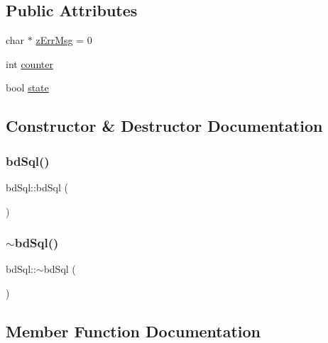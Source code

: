 \subsection*{Public Attributes}
\begin{DoxyCompactItemize}
\item 
char $\ast$ \mbox{\hyperlink{classbd_sql_abaf69eb30f16320aa8d2f91d6aa43b7d}{z\+Err\+Msg}} = 0
\item 
int \mbox{\hyperlink{classbd_sql_a1c7d57e529b44058fda8f4bd2ad47d51}{counter}}
\item 
bool \mbox{\hyperlink{classbd_sql_ac232282cfe62fee6b794b9c76934d28e}{state}}
\end{DoxyCompactItemize}


\subsection{Constructor \& Destructor Documentation}
\mbox{\label{classbd_sql_a05c6da7edc08d18ed053427bcf850a7e}} 
\subsubsection{\texorpdfstring{bd\+Sql()}{bdSql()}}
{\footnotesize\ttfamily bd\+Sql\+::bd\+Sql (\begin{DoxyParamCaption}{ }\end{DoxyParamCaption})}

\mbox{\label{classbd_sql_a14a73f3109cf0ac6e1cabc98e31b7afe}} 
\subsubsection{\texorpdfstring{$\sim$bd\+Sql()}{~bdSql()}}
{\footnotesize\ttfamily bd\+Sql\+::$\sim$bd\+Sql (\begin{DoxyParamCaption}{ }\end{DoxyParamCaption})}



\subsection{Member Function Documentation}
\mbox{\label{classbd_sql_a1caa0d6598b68db4c5f7148a62072990}} 

